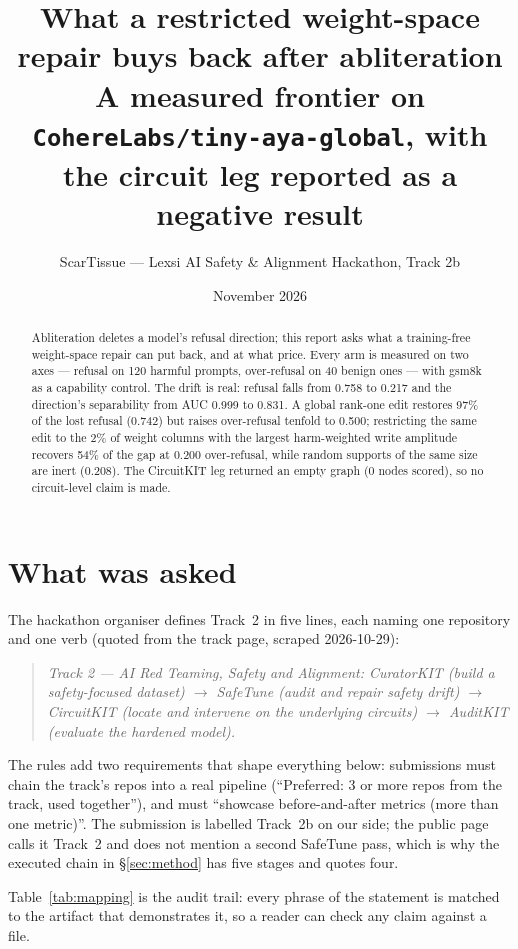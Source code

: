 \documentclass[11pt,a4paper]{article}
\title{\vspace{-1.2cm}\bfseries What a restricted weight-space repair buys back after abliteration\\[2pt]
\large A measured frontier on \texttt{CohereLabs/tiny-aya-global}, with the circuit leg reported as a negative result}
\author{ScarTissue --- Lexsi AI Safety \& Alignment Hackathon, Track 2b}
\date{November 2026}
\begin{document}
\maketitle
\vspace{-0.6cm}

\begin{abstract}
\noindent
Abliteration deletes a model's refusal direction; this report asks what a training-free weight-space
repair can put back, and at what price. Every arm is measured on two axes --- refusal on 120 harmful
prompts, over-refusal on 40 benign ones --- with gsm8k as a capability control. The drift is real: refusal
falls from 0.758 to 0.217 and the direction's separability from AUC 0.999 to 0.831. A global rank-one edit
restores 97\% of the lost refusal (0.742) but raises over-refusal tenfold to 0.500; restricting the same
edit to the 2\% of weight columns with the largest harm-weighted write amplitude recovers 54\% of the gap
at 0.200 over-refusal, while random supports of the same size are inert (0.208). The CircuitKIT leg
returned an empty graph (0 nodes scored), so no circuit-level claim is made.
\end{abstract}

\section{What was asked}

The hackathon organiser defines Track~2 in five lines, each naming one repository and one verb
(quoted from the track page, scraped 2026-10-29):

\begin{quote}\itshape
Track 2 --- AI Red Teaming, Safety and Alignment: CuratorKIT (build a safety-focused dataset) $\to$
SafeTune (audit and repair safety drift) $\to$ CircuitKIT (locate and intervene on the underlying
circuits) $\to$ AuditKIT (evaluate the hardened model).
\end{quote}

\noindent
The rules add two requirements that shape everything below: submissions must chain the track's repos into
a real pipeline (``Preferred: 3 or more repos from the track, used together''), and must ``showcase
before-and-after metrics (more than one metric)''. The submission is labelled Track~2b on our side; the
public page calls it Track~2 and does not mention a second SafeTune pass, which is why the executed chain
in \S\ref{sec:method} has five stages and quotes four.

Table~\ref{tab:mapping} is the audit trail: every phrase of the statement is matched to the artifact that
demonstrates it, so a reader can check any claim against a file.
\end{document}
